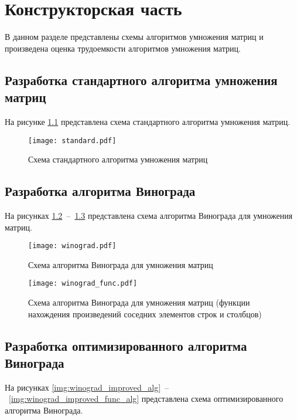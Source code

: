 \chapter{Конструкторская часть}

В данном разделе представлены схемы алгоритмов умножения матриц и произведена оценка трудоемкости алгоритмов умножения матриц.

\section{Разработка стандартного алгоритма умножения матриц}
На рисунке \ref{img:standard_alg} представлена схема стандартного алгоритма умножения матриц.

\begin{figure}[h!]
\centering
    \texttt{[image: standard.pdf]}
    \caption{Схема стандартного алгоритма умножения матриц}
    \label{img:standard_alg}	
\end{figure}

\newpage

\section{Разработка алгоритма Винограда}
На рисунках \ref{img:winograd_alg}~--~\ref{img:winograd_func_alg} представлена схема алгоритма Винограда для умножения матриц. 

\begin{figure}[h!]
    \centering
    \texttt{[image: winograd.pdf]}
    \caption{Схема алгоритма Винограда для умножения матриц}
    \label{img:winograd_alg}
\end{figure}

\newpage

\begin{figure}[h!]
    \centering
    \texttt{[image: winograd\_func.pdf]}
    \caption{Схема алгоритма Винограда для умножения матриц (функции нахождения произведений соседних элементов строк и столбцов)}
    \label{img:winograd_func_alg}
\end{figure}

\newpage

\section{Разработка оптимизированного алгоритма Винограда}
На рисунках \ref{img:winograd_improved_alg}~--~\ref{img:winograd_improved_func_alg} представлена схема оптимизированного алгоритма Винограда.

